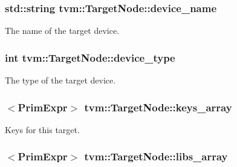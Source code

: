 \subsubsection[{\texorpdfstring{device\+\_\+name}{device_name}}]{\setlength{\rightskip}{0pt plus 5cm}std\+::string tvm\+::\+Target\+Node\+::device\+\_\+name}\hypertarget{classtvm_1_1TargetNode_a08da6caaa24e22a11859c12b941ff955}{}\label{classtvm_1_1TargetNode_a08da6caaa24e22a11859c12b941ff955}


The name of the target device. 

\subsubsection[{\texorpdfstring{device\+\_\+type}{device_type}}]{\setlength{\rightskip}{0pt plus 5cm}int tvm\+::\+Target\+Node\+::device\+\_\+type}\hypertarget{classtvm_1_1TargetNode_ab18779083b5f3afadc7dbb080bc7ebcf}{}\label{classtvm_1_1TargetNode_ab18779083b5f3afadc7dbb080bc7ebcf}


The type of the target device. 

\subsubsection[{\texorpdfstring{keys\+\_\+array}{keys_array}}]{$<${\bf Prim\+Expr}$>$ tvm\+::\+Target\+Node\+::keys\+\_\+array}\hypertarget{classtvm_1_1TargetNode_a172a4eb37b5bfae486439c06bc8182c8}{}\label{classtvm_1_1TargetNode_a172a4eb37b5bfae486439c06bc8182c8}


Keys for this target. 

\subsubsection[{\texorpdfstring{libs\+\_\+array}{libs_array}}]{$<${\bf Prim\+Expr}$>$ tvm\+::\+Target\+Node\+::libs\+\_\+array}\hypertarget{classtvm_1_1TargetNode_a32640ef524a569fbc232af24f0bdcfc5}{}\label{classtvm_1_1TargetNode_a32640ef524a569fbc232af24f0bdcfc5}


